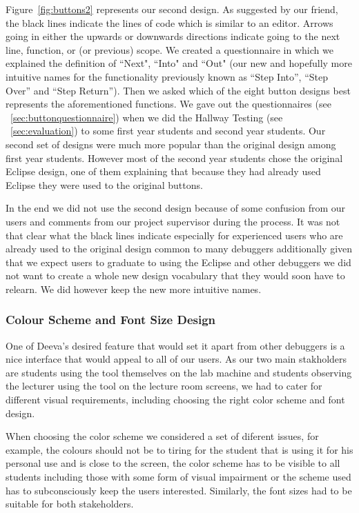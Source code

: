 \documentclass[11pt, a4paper]{article}
\begin{document}
Figure~\ref{fig:buttons2} represents our second design.
As suggested by our friend, the black lines indicate the lines of code which is similar to an editor.
Arrows going in either the upwards or downwards directions indicate going to the next line, function, or (or previous) scope.
We created a questionnaire in which we explained the definition of ``Next", ``Into" and ``Out" (our new and hopefully more intuitive names for the functionality previously known as ``Step Into'', ``Step Over'' and ``Step Return'').
Then we asked which of the eight button designs best represents the aforementioned functions.
We gave out the questionnaires (see ~\cref{sec:buttonquestionnaire}) when we did the Hallway Testing (see ~\cref{sec:evaluation}) to some first year students and second year students.
Our second set of designs were much more popular than the original design among first year students.
However most of the second year students chose the original Eclipse design, one of them explaining that because they had already used Eclipse they were used to the original buttons.

In the end we did not use the second design because of some confusion from our users and comments from our project supervisor during the process.
It was not that clear what the black lines indicate especially for experienced users who are already used to the original design common to many debuggers additionally given that we expect users to graduate to using the Eclipse and other debuggers we did not want to create a whole new design vocabulary that they would soon have to relearn.
We did however keep the new more intuitive names.

\subsubsection{Colour Scheme and Font Size Design}
One of Deeva's desired feature that would set it apart from other debuggers is a nice interface that would appeal to all of our users.
As our two main stakholders are students using the tool themselves on the lab machine and students observing the lecturer using the tool on the lecture room screens, we had to cater for different visual requirements, including choosing the right color scheme and font design.

When choosing the color scheme we considered a set of diferent issues, for example, the colours should not be to tiring for the student that is using it for his personal use and is close to the screen, the color scheme has to be visible to all students including those with some form of visual impairment or the scheme used has to subconsciously keep the users interested.
Similarly, the font sizes had to be suitable for both stakeholders.
\end{document}

